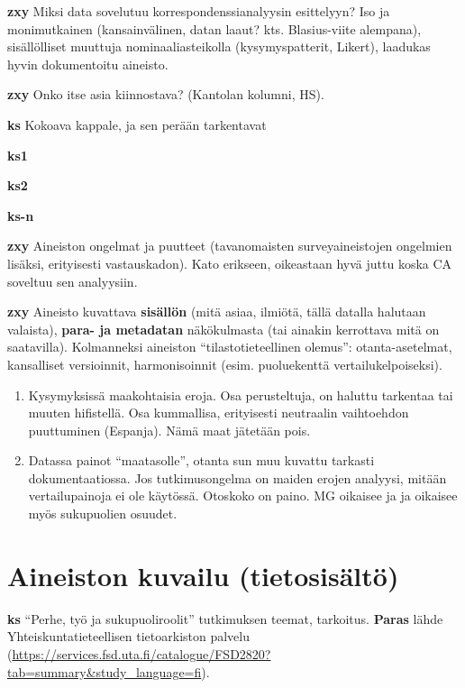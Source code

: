 \documentclass[
  finnish,
]{book}
\begin{document}
\textbf{zxy} Miksi data sovelutuu korrespondenssianalyysin esittelyyn? Iso ja monimutkainen (kansainvälinen, datan laaut? kts. Blasius-viite alempana), sisällölliset muuttuja nominaaliasteikolla (kysymyspatterit, Likert), laadukas hyvin dokumentoitu aineisto.

\textbf{zxy} Onko itse asia kiinnostava? (Kantolan kolumni, HS).

\textbf{ks} Kokoava kappale, ja sen perään tarkentavat

\textbf{ks1}

\textbf{ks2}

\textbf{ks-n}

\textbf{zxy} Aineiston ongelmat ja puutteet (tavanomaisten surveyaineistojen ongelmien
lisäksi, erityisesti vastauskadon). Kato erikseen, oikeastaan hyvä juttu koska
CA soveltuu sen analyysiin.

\textbf{zxy} Aineisto kuvattava \textbf{sisällön} (mitä asiaa, ilmiötä, tällä datalla
halutaan valaista), \textbf{para- ja metadatan} näkökulmasta (tai ainakin kerrottava
mitä on saatavilla). Kolmanneksi aineiston ``tilastotieteellinen olemus'':
otanta-asetelmat, kansalliset versioinnit, harmonisoinnit (esim. puoluekenttä
vertailukelpoiseksi).

\begin{enumerate}
\def\labelenumi{\arabic{enumi}.}
\item
  Kysymyksissä maakohtaisia eroja. Osa perusteltuja, on haluttu tarkentaa tai
  muuten hifistellä. Osa kummallisa, erityisesti neutraalin vaihtoehdon puuttuminen
  (Espanja). Nämä maat jätetään pois.
\item
  Datassa painot ``maatasolle'', otanta sun muu kuvattu tarkasti dokumentaatiossa.
  Jos tutkimusongelma on maiden erojen analyysi, mitään vertailupainoja ei ole
  käytössä. Otoskoko on paino. MG oikaisee ja ja oikaisee myös sukupuolien osuudet.
\end{enumerate}

\hypertarget{aineiston-kuvailu-tietosisuxe4ltuxf6}{%
\section{Aineiston kuvailu (tietosisältö)}\label{aineiston-kuvailu-tietosisuxe4ltuxf6}}

\textbf{ks} ``Perhe, työ ja sukupuoliroolit'' tutkimuksen teemat, tarkoitus. \textbf{Paras}
lähde Yhteiskuntatieteellisen tietoarkiston palvelu
(\url{https://services.fsd.uta.fi/catalogue/FSD2820?tab=summary\&study_language=fi}).
\end{document}
